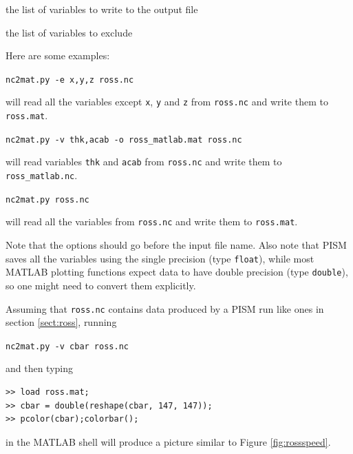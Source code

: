 \documentclass[11pt,final]{amsart}
\begin{document}
 the list of variables to write to the output file

 the list of variables to exclude

Here are some examples:

\verb|nc2mat.py -e x,y,z ross.nc|

\noindent will read all the variables except \verb|x|, \verb|y| and \verb|z| from \verb|ross.nc| and write them to \verb|ross.mat|.

\verb|nc2mat.py -v thk,acab -o ross_matlab.mat ross.nc|

\noindent will read variables \verb|thk| and \verb|acab| from \verb|ross.nc| and write them to \verb|ross_matlab.nc|.

\verb|nc2mat.py ross.nc|

\noindent will read all the variables from \verb|ross.nc| and write them to \verb|ross.mat|.

Note that the options should go before the input file name. Also note that PISM saves all the variables using the single precision (type \verb|float|), while most MATLAB plotting functions expect data to have double precision (type \verb|double|), so one might need to convert them explicitly.

Assuming that \verb|ross.nc| contains data produced by a PISM run like ones in section \ref{sect:ross}, running

\verb|nc2mat.py -v cbar ross.nc|

\noindent and then typing
\begin{verbatim}
>> load ross.mat;
>> cbar = double(reshape(cbar, 147, 147));
>> pcolor(cbar);colorbar();
\end{verbatim}
in the MATLAB shell will produce a picture similar to Figure \ref{fig:rossspeed}.

\label{sect:index}
\printindex
\end{document}
